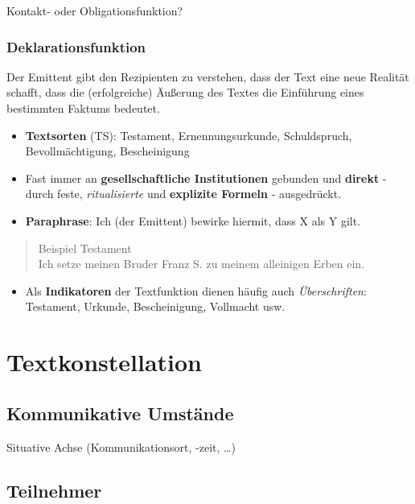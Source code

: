 \documentclass[
  letterpaper,
]{scrbook}
\providecommand{\tightlist}{%
  \setlength{\itemsep}{0pt}\setlength{\parskip}{0pt}}\usepackage{longtable,booktabs,array}
\begin{document}
Kontakt- oder Obligationsfunktion?

\hypertarget{deklarationsfunktion}{%
\subsection{Deklarationsfunktion}\label{deklarationsfunktion}}

Der Emittent gibt den Rezipienten zu verstehen, dass der Text eine neue
Realität schafft, dass die (erfolgreiche) Äußerung des Textes die
Einführung eines bestimmten Faktums bedeutet.

\begin{itemize}
\item
  \textbf{Textsorten} (TS): Testament, Ernennungsurkunde, Schuldspruch,
  Bevollmächtigung, Bescheinigung
\item
  Fast immer an \textbf{gesellschaftliche Institutionen} gebunden und
  \textbf{direkt} - durch feste, \emph{ritualisierte} und
  \textbf{explizite Formeln} - ausgedrückt.
\item
  \textbf{Paraphrase}: Ich (der Emittent) bewirke hiermit, dass X als Y
  gilt.
\end{itemize}

\begin{quote}
Beispiel Testament\\
Ich setze meinen Bruder Franz S. zu meinem alleinigen Erben ein.
\end{quote}

\begin{itemize}
\tightlist
\item
  Als \textbf{Indikatoren} der Textfunktion dienen häufig auch
  \emph{Überschriften}: Testament, Urkunde, Bescheinigung, Vollmacht
  usw.
\end{itemize}

\hypertarget{textkonstellation}{%
\chapter{Textkonstellation}\label{textkonstellation}}

\hypertarget{kommunikative-umstuxe4nde}{%
\section{Kommunikative Umstände}\label{kommunikative-umstuxe4nde}}

Situative Achse (Kommunikationsort, -zeit, \ldots)

\hypertarget{teilnehmer}{%
\section{Teilnehmer}\label{teilnehmer}}
\end{document}
